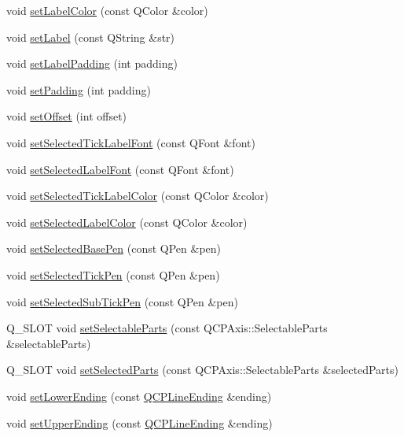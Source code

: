 \begin{DoxyCompactItemize}
\item 
void \hyperlink{classQCPAxis_a6c906fe56d75f0122335b9f79b999608}{set\+Label\+Color} (const Q\+Color \&color)
\item 
void \hyperlink{classQCPAxis_a33bcc382c111c9f31bb0687352a2dea4}{set\+Label} (const Q\+String \&str)
\item 
void \hyperlink{classQCPAxis_a4391192a766e5d20cfe5cbc17607a7a2}{set\+Label\+Padding} (int padding)
\item 
void \hyperlink{classQCPAxis_a5691441cb3de9e9844855d339c0db279}{set\+Padding} (int padding)
\item 
void \hyperlink{classQCPAxis_a04a652603cbe50eba9969ee6d68873c3}{set\+Offset} (int offset)
\item 
void \hyperlink{classQCPAxis_a845ccb560b7bc5281098a5be494145f6}{set\+Selected\+Tick\+Label\+Font} (const Q\+Font \&font)
\item 
void \hyperlink{classQCPAxis_a02ec2a75d4d8401eaab834fbc6803d30}{set\+Selected\+Label\+Font} (const Q\+Font \&font)
\item 
void \hyperlink{classQCPAxis_a9bdbf5e63ab15187f3a1de9440129227}{set\+Selected\+Tick\+Label\+Color} (const Q\+Color \&color)
\item 
void \hyperlink{classQCPAxis_a5d502dec597c634f491fdd73d151c72d}{set\+Selected\+Label\+Color} (const Q\+Color \&color)
\item 
void \hyperlink{classQCPAxis_aeb917a909215605b95ef2be843de1ee8}{set\+Selected\+Base\+Pen} (const Q\+Pen \&pen)
\item 
void \hyperlink{classQCPAxis_a8360502685eb782edbf04019c9345cdc}{set\+Selected\+Tick\+Pen} (const Q\+Pen \&pen)
\item 
void \hyperlink{classQCPAxis_a2a00a7166600155eac26843132eb9576}{set\+Selected\+Sub\+Tick\+Pen} (const Q\+Pen \&pen)
\item 
Q\+\_\+\+S\+L\+OT void \hyperlink{classQCPAxis_a513f9b9e326c505d9bec54880031b085}{set\+Selectable\+Parts} (const Q\+C\+P\+Axis\+::\+Selectable\+Parts \&selectable\+Parts)
\item 
Q\+\_\+\+S\+L\+OT void \hyperlink{classQCPAxis_ab9d7a69277dcbed9119b3c1f25ca19c3}{set\+Selected\+Parts} (const Q\+C\+P\+Axis\+::\+Selectable\+Parts \&selected\+Parts)
\item 
void \hyperlink{classQCPAxis_a08af1c72db9ae4dc8cb8a973d44405ab}{set\+Lower\+Ending} (const \hyperlink{classQCPLineEnding}{Q\+C\+P\+Line\+Ending} \&ending)
\item 
void \hyperlink{classQCPAxis_a69119b892fc306f651763596685aa377}{set\+Upper\+Ending} (const \hyperlink{classQCPLineEnding}{Q\+C\+P\+Line\+Ending} \&ending)

\end{DoxyCompactItemize}

